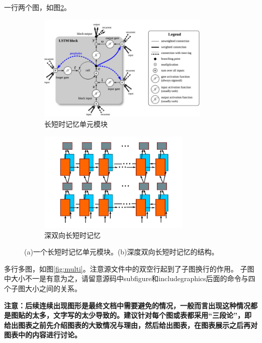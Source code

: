 一行两个图，如图\ref{fig:lstm}。
\begin{figure}[ht!]
	\centering
	\begin{subfigure}{.5\textwidth}
		\centering
		\includegraphics[width=0.9\textwidth]{figure/lstm1.png}
		\caption{长短时记忆单元模块}
	\end{subfigure}
	\begin{subfigure}{.4\textwidth}
		\centering
		\includegraphics[width=0.8\textwidth]{figure/lstm2.png}
		\caption{深双向长短时记忆}
		\label{fig:lstm2}
	\end{subfigure}
	\caption{(a)一个长短时记忆单元模块。(b)深度双向长短时记忆的结构。}
	\label{fig:lstm}
\end{figure}

多行多图，如图\ref{fig:multi}。注意源文件中的双空行起到了子图换行的作用。
子图中大小不一是有意为之，请留意源码中subfigure和includegraphics后面的命令与四个子图大小之间的关系。

\textbf{注意：后续连续出现图形是最终文档中需要避免的情况，一般而言出现这种情况都是图贴的太多，文字写的太少导致的。建议针对每个图或表都采用“三段论”，即给出图表之前先介绍图表的大致情况与理由，然后给出图表，在图表展示之后再对图表中的内容进行讨论。}

